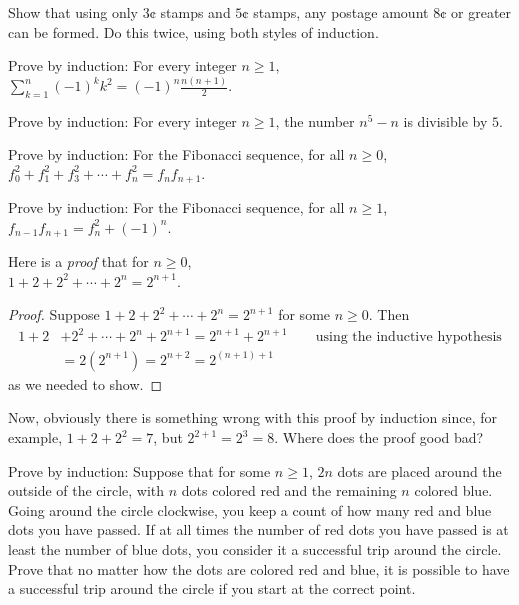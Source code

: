 \begin{prob}
Show that using only $3 \cent$ stamps and  $5\cent$
stamps,
any postage amount $8\cent$ or greater can be formed.
Do this twice, using both styles of induction.
\end{prob}

\begin{prob}
Prove by induction: For every integer $n\geq 1$, \\
$\displaystyle \sum_{k=1}^{n} (-1)^{k} k^{2} = (-1)^{n} \frac{n(n+1)}{2}$.
\end{prob}

\begin{prob}
Prove by induction: For every integer $n\geq 1$, the number $n^5-n$ is divisible by $5$.
\end{prob}

\begin{prob}
Prove by induction: For the Fibonacci sequence, for all $n\geq 0$,\\
 $f_{0}^{2}+ f_{1}^{2} + f_{3}^{2} +\cdots +f_{n}^{2}= f_{n}f_{n+1}.$
\end{prob}

\begin{prob}
Prove by induction: For the Fibonacci sequence, for all $n\geq 1$, \\
$f_{n-1}f_{n+1} = f_{n}^{2 } + (-1)^{n}$.
\end{prob}

\begin{prob}
Here is a {\itshape proof} that for $n\geq 0$, \\
 $1+ 2 + 2^2 +  \cdots + 2^n = 2^{n+1}$.
\begin{proof}
Suppose $1+ 2 + 2^2 +  \cdots + 2^n = 2^{n+1}$ for some $n\geq 0$. Then
\begin{align*}
 1+ 2 &+ 2^2 +  \cdots + 2^n  + 2^{n+1} = 2^{n+1} +2^{n+1} \qquad\text{using the inductive hypothesis}\\
 &= 2(2^{n+1}) = 2^{n+2} = 2^{(n+1)+1}
 \end{align*}
 as we needed to show.
 \end{proof}
 
 Now, obviously there is something wrong with this proof by induction since, for example,
 $1+2+2^2 = 7$, but $2^{2+1} = 2^3 = 8$. Where does the proof good bad?
 \end{prob}

\begin{prob}
Prove by induction: Suppose that for some $n\geq 1$, $2n$ dots are placed around the outside of the circle, with $n$ dots colored red and the remaining $n$ colored blue. Going around the circle clockwise, you keep a count of how many red and blue dots you have passed. If at all times the number of red dots you have passed is at least the number of blue dots, you consider it a successful trip around the circle. Prove that no matter how the dots are colored red and blue, it is possible to have a successful trip around the circle if you start at the correct point.
\end{prob}

